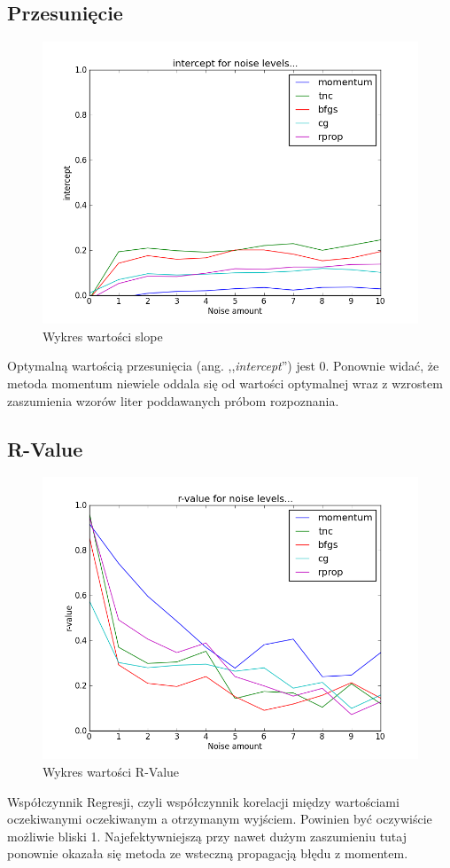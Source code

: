 \documentclass[a4paper]{article}
\begin{document}
\subsection{Przesunięcie}
\begin{figure}[pht]
 \centering
 \includegraphics[scale=0.5]{../compare_plots/compare_plot_intercept}
 \caption{Wykres wartości slope}\label{rys:plot1}
\end{figure}
Optymalną wartością przesunięcia (ang. ,,\textit{intercept}'') jest 0. Ponownie widać, że metoda momentum niewiele oddala się od
wartości optymalnej wraz z wzrostem zaszumienia wzorów liter poddawanych próbom rozpoznania.

\subsection{R-Value}
\begin{figure}[pht]
 \centering
 \includegraphics[scale=0.5]{../compare_plots/compare_plot_r_value}
 \caption{Wykres wartości R-Value}\label{rys:plot1}
\end{figure}
Współczynnik Regresji, czyli współczynnik korelacji między wartościami oczekiwanymi oczekiwanym a otrzymanym wyjściem.
Powinien być oczywiście możliwie bliski 1. 
Najefektywniejszą przy nawet dużym zaszumieniu tutaj ponownie okazała się metoda ze wsteczną propagacją błędu z momentem.
\end{document}
